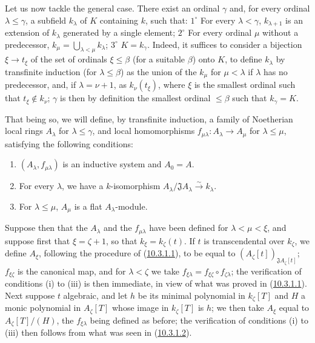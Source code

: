 \begin{env}[10.3.1.4]
\label{0.10.3.1.4}
Let us now tackle the general case. There exist an ordinal $\gamma$ and, for
every ordinal $\lambda\leq\gamma$, a subfield $k_\lambda$ of $K$ containing
$k$, such that: $1^\circ$ For every $\lambda<\gamma$, $k_{\lambda+1}$ is
an extension of $k_\lambda$ generated by a single element; $2^\circ$ For
every ordinal $\mu$ without a predecessor,
$k_\mu=\bigcup_{\lambda<\mu}k_\lambda$; $3^\circ$ $K=k_\gamma$. Indeed, it
suffices to consider a bijection $\xi\to t_\xi$ of the set of
ordinals $\xi\leq\beta$ (for a suitable $\beta$) onto $K$, to define
$k_\lambda$ by transfinite induction (for $\lambda\leq\beta$) as the
union of the $k_\mu$ for $\mu<\lambda$ if $\lambda$ has no predecessor,
and, if $\lambda=\nu+1$, as $k_\nu(t_\xi)$, where $\xi$ is the smallest
ordinal such that $t_\xi\notin k_\nu$; $\gamma$ is then by definition the
smallest ordinal $\leq\beta$ such that $k_\gamma=K$.

That being so, we will define, by transfinite induction, a family
of Noetherian local rings $A_\lambda$ for $\lambda\leq\gamma$, and local
homomorphisms $f_{\mu\lambda}:A_\lambda\to A_\mu$ for
$\lambda\leq\mu$, satisfying the following conditions:
\begin{enumerate}
  \item[(i)] $(A_\lambda,f_{\mu\lambda})$ is an inductive system and $A_0=A$.
  \item[(ii)] For every $\lambda$, we have a $k$-isomorphism
    $A_\lambda/\mathfrak J A_\lambda\xrightarrow{\sim}k_\lambda$.
  \item[(iii)] For $\lambda\leq\mu$, $A_\mu$ is a flat $A_\lambda$-module.
\end{enumerate}

Suppose then that the $A_\lambda$ and the $f_{\mu\lambda}$ have been defined for
$\lambda<\mu<\xi$, and suppose first that $\xi=\zeta+1$, so
that $k_\xi=k_\zeta(t)$. If $t$ is transcendental over $k_\zeta$, we define
$A_\xi$, following the procedure of (\hyperref[0.10.3.1.1]{10.3.1.1}), to be
equal to $(A_\zeta[t])_{\mathfrak J A_\zeta[t]}$;
$f_{\xi\zeta}$ is the canonical map, and for $\lambda<\zeta$ we take
$f_{\xi\lambda}=f_{\xi\zeta}\circ f_{\zeta\lambda}$; the verification of
conditions (i) to (iii) is then immediate, in view of what was proved in
(\hyperref[0.10.3.1.1]{10.3.1.1}). Next suppose $t$ algebraic, and
let $h$ be its minimal polynomial in $k_\zeta[T]$ and $H$ a monic polynomial in
$A_\zeta[T]$ whose image in $k_\zeta[T]$ is $h$; we then take $A_\xi$
equal to $A_\zeta[T]/(H)$, the $f_{\xi\lambda}$ being defined as
before; the verification of conditions (i) to (iii) then follows from
what was seen in (\hyperref[0.10.3.1.2]{10.3.1.2}).


\end{env}

